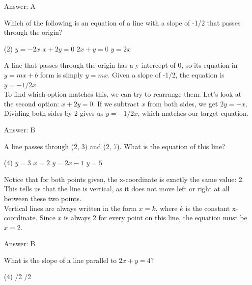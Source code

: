 \documentclass[11pt,paper=a4,answers]{exam}
\begin{document}
\begin{questions}
\begin{solution}
\vspace{15pt}
Answer: \colorbox{yellow!100}{A}
\end{solution}

\question
Which of the following is an equation of a line with a slope of -1/2 that passes through the origin?
\begin{tasks}(2)
    \task $y = -2x$
    \task $x + 2y = 0$
    \task $2x + y = 0$
    \task $y = 2x$
\end{tasks}

\begin{solution}
A line that passes through the origin has a y-intercept of 0, so its equation in $y = mx + b$ form is simply $y = mx$. Given a slope of -1/2, the equation is $y = -1/2x$.
\\[10pt]
To find which option matches this, we can try to rearrange them. Let's look at the second option: $x + 2y = 0$. If we subtract $x$ from both sides, we get $2y = -x$. Dividing both sides by 2 gives us $y = -1/2x$, which matches our target equation.

\vspace{15pt}
Answer: \colorbox{yellow!100}{B}
\end{solution}

\question
A line passes through (2, 3) and (2, 7). What is the equation of this line?
\begin{tasks}(4)
    \task $y = 3$
    \task $x = 2$
    \task $y = 2x - 1$
    \task $y = 5$
\end{tasks}

\begin{solution}
Notice that for both points given, the x-coordinate is exactly the same value: 2. This tells us that the line is vertical, as it does not move left or right at all between these two points.
\\[10pt]
Vertical lines are always written in the form $x = k$, where $k$ is the constant x-coordinate. Since $x$ is always 2 for every point on this line, the equation must be $x = 2$.

\vspace{15pt}
Answer: \colorbox{yellow!100}{B}
\end{solution}

\question
What is the slope of a line parallel to $2x + y = 4$?
\begin{tasks}(4)
    /2
    /2
\end{tasks}


\end{questions}
\end{document}
